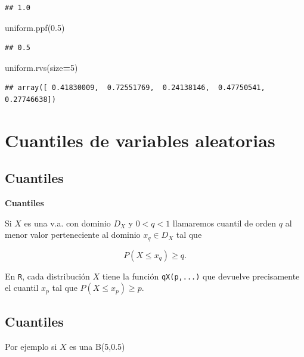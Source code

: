 \documentclass[]{book}
\newenvironment{Shaded}{\begin{snugshade}}{\end{snugshade}}
\newcommand{\DecValTok}[1]{\textcolor[rgb]{0.00,0.00,0.81}{#1}}
\newcommand{\FloatTok}[1]{\textcolor[rgb]{0.00,0.00,0.81}{#1}}
\newcommand{\NormalTok}[1]{#1}
\newcommand{\OperatorTok}[1]{\textcolor[rgb]{0.81,0.36,0.00}{\textbf{#1}}}
\begin{document}
\begin{verbatim}
## 1.0
\end{verbatim}

\begin{Shaded}
\begin{Highlighting}[]
\NormalTok{uniform.ppf(}\FloatTok{0.5}\NormalTok{)}
\end{Highlighting}
\end{Shaded}

\begin{verbatim}
## 0.5
\end{verbatim}

\begin{Shaded}
\begin{Highlighting}[]
\NormalTok{uniform.rvs(size}\OperatorTok{=}\DecValTok{5}\NormalTok{)}
\end{Highlighting}
\end{Shaded}

\begin{verbatim}
## array([ 0.41830009,  0.72551769,  0.24138146,  0.47750541,  0.27746638])
\end{verbatim}

\hypertarget{cuantiles-de-variables-aleatorias}{%
\section{Cuantiles de variables aleatorias}\label{cuantiles-de-variables-aleatorias}}

\hypertarget{cuantiles}{%
\subsection{Cuantiles}\label{cuantiles}}

\textbf{Cuantiles}

Si \(X\) es una v.a. con dominio \(D_X\) y \(0<q<1\) llamaremos cuantil de orden \(q\) al menor valor perteneciente al dominio \(x_q\in D_X\) tal que

\[P(X\leq x_q)\geq q.\]

En \texttt{R}, cada distribución \(X\) tiene la función \texttt{qX(p,...)} que devuelve precisamente el cuantil \(x_p\) tal que \(P(X\leq x_p)\geq p.\)

\hypertarget{cuantiles-1}{%
\subsection{Cuantiles}\label{cuantiles-1}}

Por ejemplo si \(X\) es una B(5,0.5)
\end{document}
